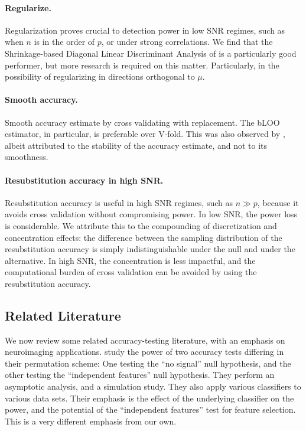 \documentclass[journal]{IEEEtran}
\begin{document}
\paragraph{Regularize.}
Regularization proves crucial to detection power in low SNR regimes, such as when $n$ is in the order of $p$, or under strong correlations.
We find that the Shrinkage-based Diagonal Linear Discriminant Analysis of \cite{pang_shrinkage-based_2009} is a particularly good performer, but more research is required on this matter. 
Particularly, in the possibility of regularizing in directions orthogonal to $\mu$. 


\paragraph{Smooth accuracy.}
Smooth accuracy estimate by cross validating with replacement. 
The bLOO estimator, in particular, is preferable over V-fold.
This was also observed by \cite{yu2007two}, albeit attributed to the stability of the accuracy estimate, and not to its smoothness. 


\paragraph{Resubstitution accuracy in high SNR.} 
Resubstitution accuracy is useful in high SNR regimes, such as $n \gg p$, because it avoids cross validation without compromising power. 
In low SNR, the power loss is considerable. 
We attribute this to the compounding of discretization and concentration effects: the difference between the sampling distribution of the resubstitution accuracy is simply indistinguishable under the null and under the alternative. 
In high SNR, the concentration is less impactful, and the computational burden of cross validation can be avoided by using the resubstitution accuracy. \newline


\subsection{Related Literature}
We now review some related accuracy-testing literature, with an emphasis on neuroimaging applications.
\cite{ojala_permutation_2010} study the power of two accuracy tests differing in their permutation scheme:
One testing the ``no signal'' null hypothesis, and the other testing the ``independent features'' null hypothesis. 
They perform an asymptotic analysis, and a simulation study. 
They also apply various classifiers to various data sets. 
Their emphasis is the effect of the underlying classifier on the power, and the potential of the ``independent features'' test for feature selection.
This is a very different emphasis from our own.
\end{document}
